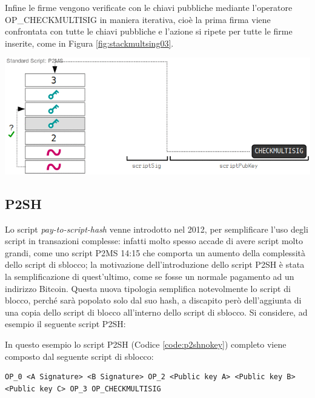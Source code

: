 Infine le firme vengono verificate con le chiavi pubbliche mediante l’operatore OP\_CHECKMULTISIG in maniera iterativa, cioè la prima firma viene confrontata con tutte le chiavi pubbliche e l’azione si ripete per tutte le firme inserite, come in Figura \ref{fig:stackmultsing03}.

{\centering
\vspace{15pt}
\includegraphics[scale=0.35]{images/script/multisig/3.png}
\vspace{10pt}
\par}

\subsection{P2SH}
Lo script {\it pay-to-script-hash \/} venne introdotto nel 2012, per semplificare l’uso degli script in transazioni complesse: infatti molto spesso accade di avere script molto grandi, come uno script P2MS 14:15 che comporta un aumento della complessità dello script di sblocco; la motivazione dell’introduzione dello script P2SH è stata la semplificazione di quest’ultimo, come se fosse un normale pagamento ad un indirizzo Bitcoin.
Questa nuova tipologia semplifica notevolmente lo script di blocco, perché sarà popolato solo dal suo hash, a discapito però dell’aggiunta di una copia dello script di blocco all’interno dello script di sblocco. Si considere, ad esempio il seguente script P2SH:



In questo esempio lo script P2SH (Codice \ref{code:p2shnokey}) completo viene composto dal seguente script di sblocco:
\begin{lstlisting}[language=bitcoinscript, label={code:p2shunlock}, caption={Script P2SH di sblocco.}]
OP_0 <A Signature> <B Signature> OP_2 <Public key A> <Public key B>
<Public key C> OP_3 OP_CHECKMULTISIG
\end{lstlisting}

